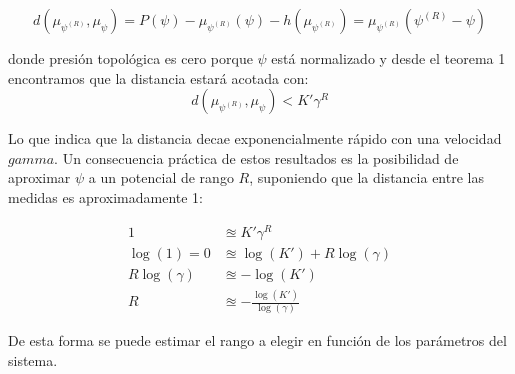 \begin{equation*}
    d(\mu_{\psi^{(R)}}, \mu_\psi) = P(\psi) - \mu_{\psi^{(R)}}(\psi) - h(\mu_{\psi^{(R)}}) = \mu_{\psi^{(R)}}(\psi^{(R)}-\psi)
\end{equation*}

donde presión topológica es cero porque $\psi$ está normalizado y desde el teorema 1 encontramos que la distancia estará acotada con:
\begin{equation*}
     d(\mu_{\psi^{(R)}},  \mu_\psi) < K'\gamma^R
\end{equation*}

Lo que indica que la distancia decae exponencialmente rápido con una velocidad $gamma$.
Un consecuencia práctica de estos resultados es la posibilidad de aproximar $\psi$ a un potencial de rango $R$, suponiendo que la distancia entre las medidas es aproximadamente 1:

\begin{align*}
    1 & \approxeq K'\gamma^R \\
    \log(1) = 0 & \approxeq \log(K')+R\log(\gamma) \\
    R\log(\gamma) & \approxeq - \log(K') \\
    R & \approxeq - \frac{\log(K')}{\log(\gamma)}
\end{align*}
    
De esta forma se puede estimar el rango a elegir en función de los parámetros del sistema. 
